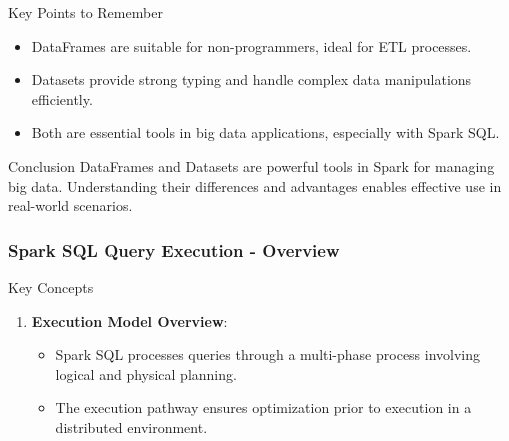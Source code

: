 \documentclass[aspectratio=169]{beamer}
\begin{document}
\begin{frame}{Key Points to Remember}
    \begin{itemize}
        \item DataFrames are suitable for non-programmers, ideal for ETL processes.
        \item Datasets provide strong typing and handle complex data manipulations efficiently.
        \item Both are essential tools in big data applications, especially with Spark SQL.
    \end{itemize}
\end{frame}

\begin{frame}{Conclusion}
    DataFrames and Datasets are powerful tools in Spark for managing big data. Understanding their differences and advantages enables effective use in real-world scenarios.
\end{frame}

\begin{frame}[fragile]
    \frametitle{Spark SQL Query Execution - Overview}
    \begin{block}{Key Concepts}
        \begin{enumerate}
            \item \textbf{Execution Model Overview}:
            \begin{itemize}
                \item Spark SQL processes queries through a multi-phase process involving logical and physical planning.
                \item The execution pathway ensures optimization prior to execution in a distributed environment.
            \end{itemize}
        \end{enumerate}
    \end{block}
\end{frame}
\end{document}
